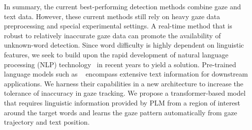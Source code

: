 In summary, the current best-performing detection methods combine gaze and text data. However, these current methods still rely on heavy gaze data preprocessing and special experimental settings. A real-time method that is robust to relatively inaccurate gaze data can promote the availability of unknown-word detection. Since word difficulty is highly dependent on linguistic features\cite{More_than_frequency}, we seek to build upon the rapid development of natural language processing (NLP) technology~\cite{attention_is_all_you_need} in recent years to yield a solution. Pre-trained language models such as ~\cite{devlin2019bert,liu2019roberta} encompass extensive text information for downstream applications. We harness their capabilities in a new architecture to increase the tolerance of inaccuracy in gaze tracking. We propose a transformer-based model that requires linguistic information provided by PLM from a region of interest around the target words and learns the gaze pattern automatically from gaze trajectory and text position.

